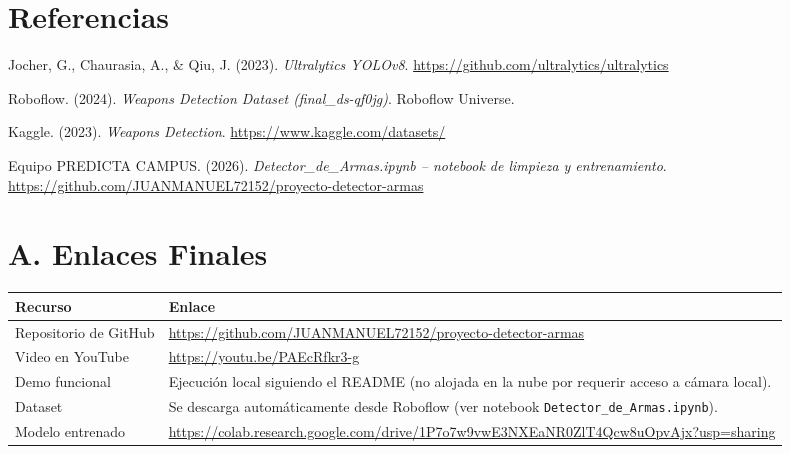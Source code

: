 \documentclass[12pt, letterpaper]{article}
\begin{document}
\section{Referencias}

\begin{flushleft}
\setlength{\parindent}{0pt}

Jocher, G., Chaurasia, A., \& Qiu, J. (2023). \textit{Ultralytics YOLOv8}. \url{https://github.com/ultralytics/ultralytics}

\vspace{12pt}
Roboflow. (2024). \textit{Weapons Detection Dataset (final\_ds-qf0jg)}. Roboflow Universe.

\vspace{12pt}
Kaggle. (2023). \textit{Weapons Detection}. \url{https://www.kaggle.com/datasets/}

\vspace{12pt}
Equipo PREDICTA CAMPUS. (2026). \textit{Detector\_de\_Armas.ipynb -- notebook de limpieza y entrenamiento}. \url{https://github.com/JUANMANUEL72152/proyecto-detector-armas}

\end{flushleft}

\section{A. Enlaces Finales}

\begin{center}
\begin{tabular}{L{4cm} L{9cm}}
\toprule
\textbf{Recurso} & \textbf{Enlace} \\
\midrule
Repositorio de GitHub & \url{https://github.com/JUANMANUEL72152/proyecto-detector-armas} \\
Video en YouTube & \url{https://youtu.be/PAEcRfkr3-g} \\
Demo funcional & Ejecución local siguiendo el README (no alojada en la nube por requerir acceso a cámara local). \\
Dataset & Se descarga automáticamente desde Roboflow (ver notebook \texttt{Detector\_de\_Armas.ipynb}). \\
Modelo entrenado & \url{https://colab.research.google.com/drive/1P7o7w9vwE3NXEaNR0ZlT4Qcw8uOpvAjx?usp=sharing} \\
\bottomrule
\end{tabular}
\end{center}
\end{document}
